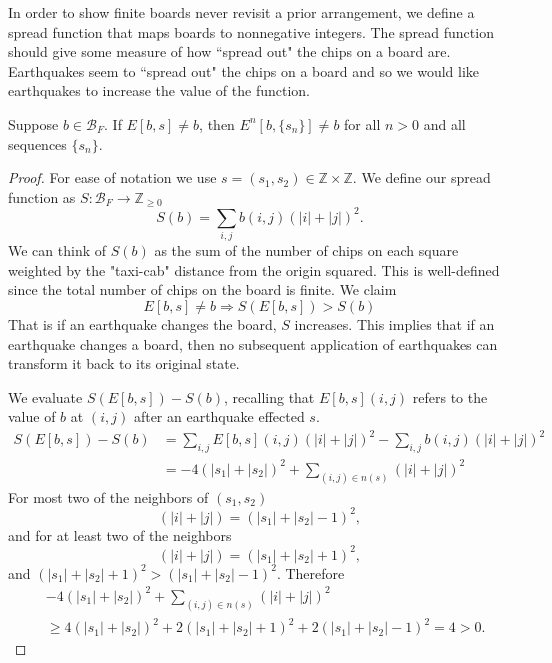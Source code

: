\documentclass[runningheads,a4paper]{llncs}
\begin{document}
In order to show finite boards never revisit a prior arrangement, we define a spread function that maps boards to nonnegative integers. The spread function should give some measure of how ``spread out" the chips on a board are. Earthquakes seem to ``spread out" the chips on a board and so we would like earthquakes to increase the value of the function. 

\begin{lemma}
Suppose $b \in \mathcal{B}_F$. If $E[b, s] \neq b$, then $E^n[b, \{s_n\}] \neq b$ for all $n > 0$ and all sequences $\{s_n\}$.
\end{lemma}

\begin{proof}
For ease of notation we use $s=(s_1, s_2) \in \mathbb{Z} \times \mathbb{Z}$. We define our spread function as $S: \mathcal{B}_F \rightarrow \mathbb{Z}_{\geq 0}$ 
\begin{equation*}
S(b) = \sum_{i,j} b(i,j)(|i|+|j|)^2. 
\end{equation*}
We can think of $S(b)$ as the sum of the number of chips on each square weighted by the "taxi-cab" distance from the origin squared. This is well-defined since the total number of chips on the board is finite. We claim 
\begin{equation*}
E[b, s] \neq b \Rightarrow S(E[b, s]) > S(b)
\end{equation*}
That is if an earthquake changes the board, $S$ increases. This implies that if an earthquake changes a board, then no subsequent application of earthquakes can transform it back to its original state.

We evaluate $S(E[b, s]) - S(b)$, recalling that $E[b, s](i,j)$ refers to the value of $b$ at $(i,j)$ after an earthquake effected $s$.
\begin{align*}
S(E[b, s]) - S(b) &=\sum_{i,j} E[b, s](i,j)(|i|+|j|)^2 - \sum_{i,j} b(i,j)(|i|+|j|)^2 \\
&=-4(|s_1| + |s_2|)^2 +\sum_{(i,j) \in n(s)} (|i| + |j|)^2
\end{align*}
For most two of the neighbors of $(s_1, s_2)$ 
\begin{equation*}
(|i|+|j|)= (|s_1|+|s_2|-1)^2,
\end{equation*}
and for at least two of the neighbors 
\begin{equation*}
(|i|+|j|)=(|s_1|+|s_2|+1)^2,
\end{equation*}
 and $(|s_1|+|s_2|+1)^2 > (|s_1|+|s_2|-1)^2$. Therefore 
\begin{align*}
&-4(|s_1| + |s_2|)^2 +\sum_{(i,j) \in n(s)} (|i| + |j|)^2 \\
& \geq 4(|s_1| + |s_2|)^2 + 2 (|s_1| + |s_2|+1)^2 + 2 (|s_1| + |s_2|-1)^2 = 4 >0.
\end{align*}
\end{proof}
\end{document}
